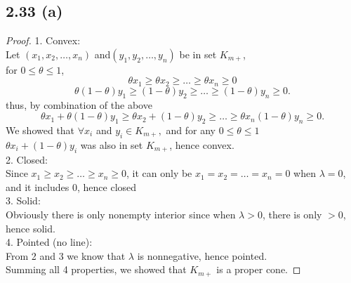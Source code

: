 \documentclass{article}
\begin{document}
\subsection*{2.33 (a)}
\begin{proof}
1. Convex:\\
Let  $(x_1, x_2, \dots, x_n)$ and$(y_1, y_2, \dots, y_n)$ be in set $K_{m+}$, \\
for $0 \leq \theta \leq 1$, 
\[\theta x_1 \ge \theta x_2 \ge \dots  \ge \theta x_n \ge 0\]
\[\theta (1 -\theta)y_1 \ge (1 -\theta)y_2  \ge \dots  \ge(1 -\theta) y_n \ge 0. \]
thus, by combination of the above
\[\theta x_1+ \theta (1 -\theta)y_1 \ge \theta x_2 + (1 -\theta)y_2  \ge \dots  \ge \theta x_n (1 -\theta) y_n \ge 0. \]
We showed that  $\forall x_i$ and $y_i \in K_{m+},$ and for any $0 \leq \theta \le 1$\\
$\theta x_i + (1-\theta) y_i$ was also in set $K_{m+}$, hence convex.\\
2. Closed:\\
Since $x_1 \ge  x_2 \ge \dots  \ge x_n \ge 0$,
it can only be $x_1 =  x_2 =\dots = x_n = 0$ when $\lambda  = 0$, and it includes $0$, hence closed\\
3. Solid:\\
Obviously there is only nonempty interior since when $\lambda > 0$, there is only $> 0$, hence solid.\\
4. Pointed (no line):\\
From 2 and 3 we know that $\lambda$ is nonnegative, hence pointed.\\
Summing all 4 properties, we showed that $K_{m+}$ is a proper cone.
\end{proof}

\end{document}
